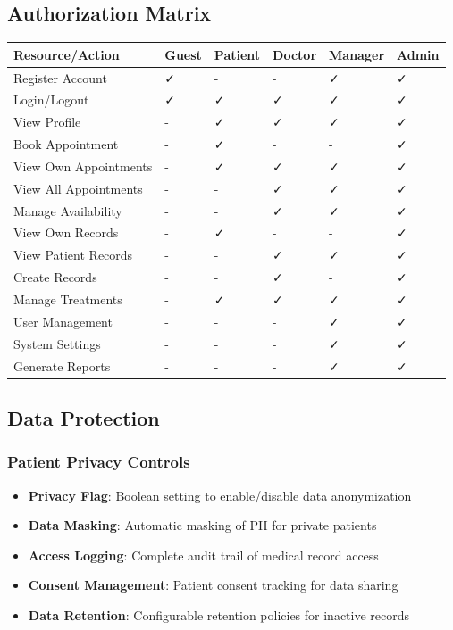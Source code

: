 \documentclass[12pt,a4paper]{article}
\begin{document}
\subsection{Authorization Matrix}

\begin{longtable}{|p{2.5cm}|p{1.5cm}|p{1.5cm}|p{1.5cm}|p{1.5cm}|p{1.5cm}|}
\hline
\textbf{Resource/Action} & \textbf{Guest} & \textbf{Patient} & \textbf{Doctor} & \textbf{Manager} & \textbf{Admin} \\
\hline
Register Account & ✓ & - & - & ✓ & ✓ \\
\hline
Login/Logout & ✓ & ✓ & ✓ & ✓ & ✓ \\
\hline
View Profile & - & ✓ & ✓ & ✓ & ✓ \\
\hline
Book Appointment & - & ✓ & - & - & ✓ \\
\hline
View Own Appointments & - & ✓ & ✓ & ✓ & ✓ \\
\hline
View All Appointments & - & - & ✓ & ✓ & ✓ \\
\hline
Manage Availability & - & - & ✓ & ✓ & ✓ \\
\hline
View Own Records & - & ✓ & - & - & ✓ \\
\hline
View Patient Records & - & - & ✓ & ✓ & ✓ \\
\hline
Create Records & - & - & ✓ & - & ✓ \\
\hline
Manage Treatments & - & ✓ & ✓ & ✓ & ✓ \\
\hline
User Management & - & - & - & ✓ & ✓ \\
\hline
System Settings & - & - & - & ✓ & ✓ \\
\hline
Generate Reports & - & - & - & ✓ & ✓ \\
\hline
\end{longtable}

\subsection{Data Protection}

\subsubsection{Patient Privacy Controls}
\begin{itemize}
    \item \textbf{Privacy Flag}: Boolean setting to enable/disable data anonymization
    \item \textbf{Data Masking}: Automatic masking of PII for private patients
    \item \textbf{Access Logging}: Complete audit trail of medical record access
    \item \textbf{Consent Management}: Patient consent tracking for data sharing
    \item \textbf{Data Retention}: Configurable retention policies for inactive records
\end{itemize}
\end{document}
